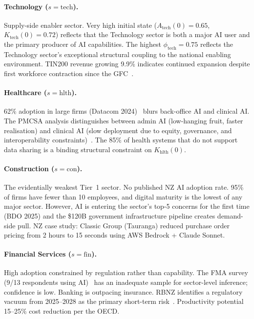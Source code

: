 \documentclass[11pt,a4paper]{article}
\begin{document}
\paragraph{Technology ($s = \text{tech}$).} Supply-side enabler sector. Very high initial state ($A_{\text{tech}}(0) = 0.65$, $K_{\text{tech}}(0) = 0.72$) reflects that the Technology sector is both a major AI user and the primary producer of AI capabilities. The highest $\phi_{\text{tech}} = 0.75$ reflects the Technology sector's exceptional structural coupling to the national enabling environment. TIN200 revenue growing 9.9\% indicates continued expansion despite first workforce contraction since the GFC~\cite{nztech2026}.

\paragraph{Healthcare ($s = \text{hlth}$).} 62\% adoption in large firms (Datacom 2024)~\cite{datacom2024} blurs back-office AI and clinical AI. The PMCSA analysis distinguishes between admin AI (low-hanging fruit, faster realisation) and clinical AI (slow deployment due to equity, governance, and interoperability constraints)~\cite{pmcsa2023}. The 85\% of health systems that do not support data sharing is a binding structural constraint on $K_{\text{hlth}}(0)$.

\paragraph{Construction ($s = \text{con}$).} The evidentially weakest Tier~1 sector. No published NZ AI adoption rate. 95\% of firms have fewer than 10 employees, and digital maturity is the lowest of any major sector. However, AI is entering the sector's top-5 concerns for the first time (BDO 2025) and the \$120B government infrastructure pipeline creates demand-side pull. NZ case study: Classic Group (Tauranga) reduced purchase order pricing from 2 hours to 15 seconds using AWS Bedrock + Claude Sonnet.

\paragraph{Financial Services ($s = \text{fin}$).} High adoption constrained by regulation rather than capability. The FMA survey (9/13 respondents using AI)~\cite{fma2024} has an inadequate sample for sector-level inference; confidence is low. Banking is outpacing insurance. RBNZ identifies a regulatory vacuum from 2025--2028 as the primary short-term risk~\cite{rbnz2025}. Productivity potential 15--25\% cost reduction per the OECD.
\end{document}
